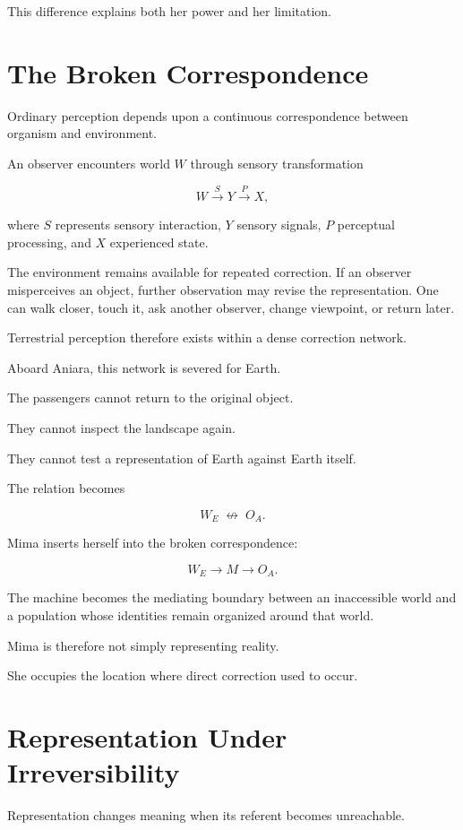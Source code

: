 \documentclass[11pt,oneside]{book}
\theoremstyle{definition}
\theoremstyle{remark}
\begin{document}
This difference explains both her power and her limitation.

\section{The Broken Correspondence}

Ordinary perception depends upon a continuous correspondence between organism and environment.

An observer encounters world \(W\) through sensory transformation

\[
W
\xrightarrow{S}
Y
\xrightarrow{P}
X,
\]

where \(S\) represents sensory interaction, \(Y\) sensory signals, \(P\) perceptual processing, and \(X\) experienced state.

The environment remains available for repeated correction. If an observer misperceives an object, further observation may revise the representation. One can walk closer, touch it, ask another observer, change viewpoint, or return later.

Terrestrial perception therefore exists within a dense correction network.

Aboard Aniara, this network is severed for Earth.

The passengers cannot return to the original object.

They cannot inspect the landscape again.

They cannot test a representation of Earth against Earth itself.

The relation becomes

\[
W_E
\;\not\longleftrightarrow\;
O_A.
\]

Mima inserts herself into the broken correspondence:

\[
W_E
\rightarrow
M
\rightarrow
O_A.
\]

The machine becomes the mediating boundary between an inaccessible world and a population whose identities remain organized around that world.

Mima is therefore not simply representing reality.

She occupies the location where direct correction used to occur.

\section{Representation Under Irreversibility}

Representation changes meaning when its referent becomes unreachable.
\end{document}
